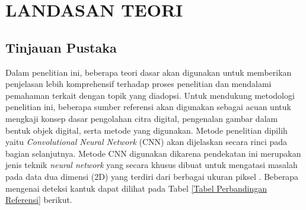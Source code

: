 \chapter{LANDASAN TEORI}

\section{Tinjauan Pustaka}


    Dalam penelitian ini, beberapa teori dasar 
    akan digunakan untuk memberikan penjelasan 
     lebih komprehensif terhadap proses penelitian 
     dan mendalami pemahaman terkait dengan topik 
     yang diadopsi. Untuk mendukung metodologi 
     penelitian ini, beberapa sumber referensi 
     akan digunakan sebagai acuan untuk mengkaji 
      konsep dasar pengolahan citra digital, 
      pengenalan gambar dalam bentuk objek digital, 
      serta metode yang digunakan. Metode penelitian 
       dipilih yaitu \textit{Convolutional Neural Network}  (CNN) akan 
       dijelaskan secara rinci pada bagian selanjutnya. Metode CNN 
       digunakan dikarena pendekatan ini merupakan jenis 
       teknik \textit{neural network} yang secara khusus dibuat 
       untuk mengatasi masalah pada data dua dimensi (2D) yang terdiri 
       dari berbagai ukuran piksel \cite{Lindholm2022}. Beberapa 
       mengenai deteksi kantuk dapat dilihat pada Tabel \ref{Tabel Perbandingan Referensi} berikut.

    

